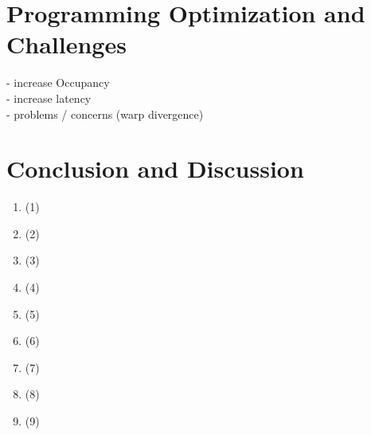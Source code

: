 \documentclass[a4paper,12pt]{llncs}
\numberwithin{equation}{section}
\begin{document}
\section{Programming Optimization and Challenges}
  - increase Occupancy\\
  - increase latency\\
  - problems / concerns (warp divergence)\\



\section{Conclusion and Discussion}

      


\begin{enumerate}
\item \cite{Rauber.2012} (1)
\item \cite{Lindholm.2008} (2)
\item \cite{Burgess.2020} (3)
\item \cite{Huang.2008} (4)
\item \cite{Bialas.2016} (5)
\item \cite{Khronos.2019} (6)
\item \cite{Wang.2019} (7)
\item \cite{NVIDIA.2018} (8)
\item \cite{NVIDIA.2019} (9)
\end{enumerate}





\newpage



\end{document}
